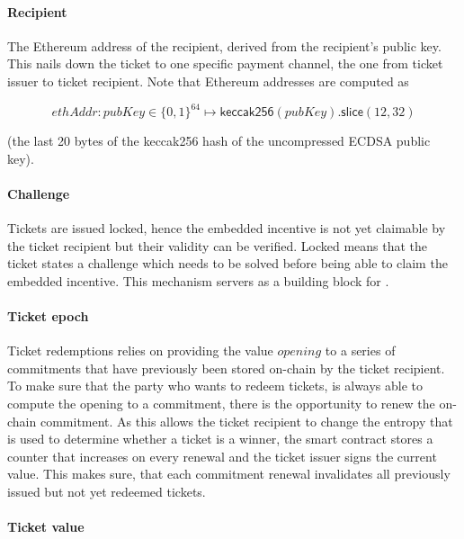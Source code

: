 \paragraph{Recipient}
\label{sec:tickets:issuance:recipient}

The Ethereum address of the recipient, derived from the recipient's public key. This nails down the ticket to one specific payment channel, the one from ticket issuer to ticket recipient. Note that Ethereum addresses are computed as

$$ ethAddr: pubKey \in \{ 0,1 \}^{64} \mapsto \mathsf{keccak256}( pubKey).\mathsf{slice}(12,32)$$

(the last 20 bytes of the keccak256 hash of the uncompressed ECDSA public key).

\paragraph{Challenge}
\label{sec:tickets:issuance:challenge}

Tickets are issued locked, hence the embedded incentive is not yet claimable by the ticket recipient but their validity can be verified. Locked means that the ticket states a challenge which needs to be solved before being able to claim the embedded incentive. This mechanism servers as a building block for .

\paragraph{Ticket epoch}
\label{sec:tickets:issuance:ticketepoch}

Ticket redemptions relies on providing the value $opening$ to a series of commitments that have previously been stored on-chain by the ticket recipient. To make sure that the party who wants to redeem tickets, is always able to compute the opening to a commitment, there is the opportunity to renew the on-chain commitment. As this allows the ticket recipient to change the entropy that is used to determine whether a ticket is a winner, the smart contract stores a counter that increases on every renewal and the ticket issuer signs the current value. This makes sure, that each commitment renewal invalidates all previously issued but not yet redeemed tickets.

\paragraph{Ticket value}
\label{sec:tickets:issuance:ticketvalue}

